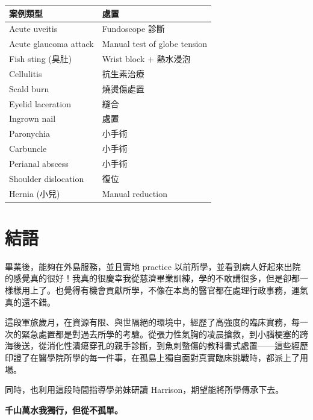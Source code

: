 \documentclass[12pt,a4paper]{article}
\newenvironment{myquote}{%
    \begin{tcolorbox}[
        colback=quote_bg,
        colframe=emergency_gray,
        boxrule=0pt,
        leftrule=3pt,
        arc=0pt,
        left=10pt,
        right=10pt,
        top=8pt,
        bottom=8pt
    ]
    \itshape
}{%
    \end{tcolorbox}
}
\begin{document}
\begin{longtable}{p{5cm}p{8cm}}
\toprule
\textbf{案例類型} & \textbf{處置} \\
\midrule
\endhead
Acute uveitis & Fundoscope 診斷 \\
Acute glaucoma attack & Manual test of globe tension \\
Fish sting (臭肚) & Wrist block + 熱水浸泡 \\
Cellulitis & 抗生素治療 \\
Scald burn & 燒燙傷處置 \\
Eyelid laceration & 縫合 \\
Ingrown nail & 處置 \\
Paronychia & 小手術 \\
Carbuncle & 小手術 \\
Perianal abscess & 小手術 \\
Shoulder dislocation & 復位 \\
Hernia (小兒) & Manual reduction \\
\bottomrule
\end{longtable}

\section{結語}

\begin{myquote}
畢業後，能夠在外島服務，並且實地 practice 以前所學，並看到病人好起來出院的感覺真的很好！我真的很慶幸我從慈濟畢業訓練，學的不敢講很多，但是卻都一樣樣用上了。也覺得有機會貢獻所學，不像在本島的醫官都在處理行政事務，運氣真的還不錯。
\end{myquote}

這段軍旅歲月，在資源有限、與世隔絕的環境中，經歷了高強度的臨床實務，每一次的緊急處置都是對過去所學的考驗。從張力性氣胸的凌晨搶救，到小腦梗塞的跨海後送，從消化性潰瘍穿孔的親手診斷，到魚刺螫傷的教科書式處置——這些經歷印證了在醫學院所學的每一件事，在孤島上獨自面對真實臨床挑戰時，都派上了用場。

同時，也利用這段時間指導學弟妹研讀 Harrison，期望能將所學傳承下去。

\vspace{1cm}

\begin{center}
\begin{tcolorbox}[
    colback=highlight_yellow,
    colframe=emergency_red,
    width=0.8\textwidth,
    arc=5pt,
    boxrule=1pt
]
\centering
\Large\bfseries
千山萬水我獨行，但從不孤單。
\end{tcolorbox}
\end{center}
\end{document}
